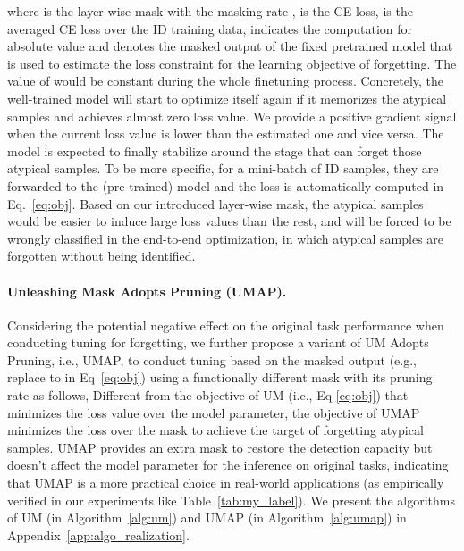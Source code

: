 \documentclass{article}
\theoremstyle{plain}
\theoremstyle{definition}
\theoremstyle{remark}
\begin{document}
where  is the layer-wise mask with the masking rate ,  is the CE loss,  is the averaged CE loss over the ID training data,  indicates the computation for absolute value and  denotes the masked output of the fixed pretrained model that is used to estimate the loss constraint for the learning objective of forgetting. The value of   would be constant during the whole finetuning process. Concretely, the well-trained model will start to optimize itself again if it memorizes the atypical samples and achieves almost zero loss value. We provide a positive gradient signal when the current loss value is lower than the estimated one and vice versa. The model is expected to finally stabilize around the stage that can forget those atypical samples. To be more specific, for a mini-batch of ID samples, they are forwarded to the (pre-trained) model and the loss is automatically computed in Eq.~\eqref{eq:obj}. Based on our introduced layer-wise mask, the atypical samples would be easier to induce large loss values than the rest, and will be forced to be wrongly classified in the end-to-end optimization, in which atypical samples are forgotten without being identified.

\paragraph{Unleashing Mask Adopts Pruning (UMAP).}  Considering the potential negative effect on the original task performance when conducting tuning for forgetting, we further propose a variant of UM Adopts Pruning, i.e., UMAP, to conduct tuning based on the masked output (e.g., replace  to  in Eq~\ref{eq:obj}) using a functionally different mask  with its pruning rate  as follows,
\label{eq:obj_umap}
Different from the objective of UM (i.e., Eq \ref{eq:obj}) that minimizes the loss value over the model parameter, the objective of UMAP minimizes the loss over the mask  to achieve the target of forgetting atypical samples. UMAP provides an extra mask to restore the detection capacity but doesn't affect the model parameter for the inference on original tasks, indicating that UMAP is a more practical choice in real-world applications (as empirically verified in our experiments like Table~\ref{tab:my_label}). We present the algorithms of UM (in Algorithm~\ref{alg:um}) and UMAP (in Algorithm~\ref{alg:umap}) in Appendix~\ref{app:algo_realization}.
\end{document}
